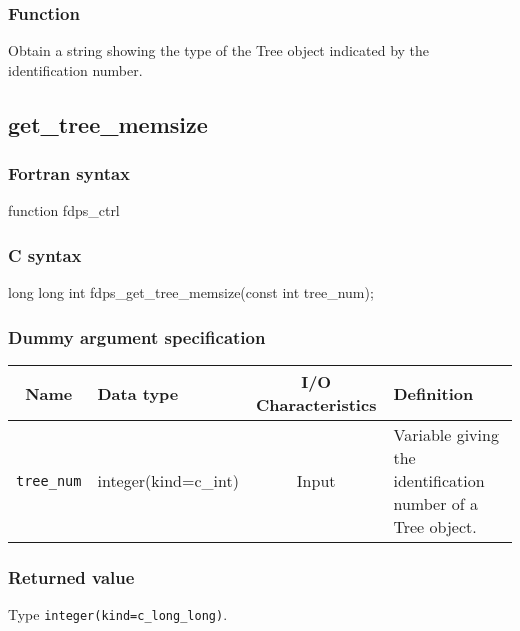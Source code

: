 \subsubsection*{Function}
Obtain a string showing the type of the Tree object indicated by the identification number.
\clearpage

\subsection{get\_tree\_memsize}
\subsubsection*{Fortran syntax}
\begin{screen}
\begin{spverbatim}
function fdps_ctrl%
\end{spverbatim}
\end{screen}

\subsubsection*{C syntax}
\begin{screen}
\begin{spverbatim}
long long int fdps_get_tree_memsize(const int tree_num);
\end{spverbatim}
\end{screen}


\subsubsection*{Dummy argument specification}
\begin{table}[h]
\begin{tabularx}{\linewidth}{cXcX}
\toprule
\rowcolor{Snow2}
Name & Data type & I/O Characteristics & Definition \\
\midrule
\verb|tree_num|  & integer(kind=c\_int)  & Input   & Variable giving the identification number of a Tree object. \\
\bottomrule
\end{tabularx}
\end{table}


\subsubsection*{Returned value}
Type \verb|integer(kind=c_long_long)|.


